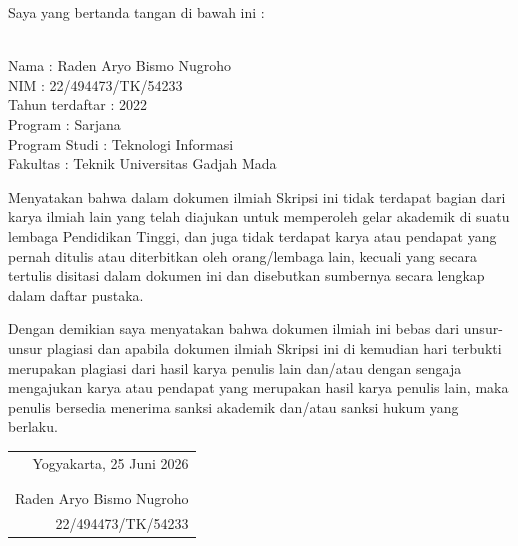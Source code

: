 \noindent Saya yang bertanda tangan di bawah ini :

\vspace{-1em}

\begin{tabbing}
\hspace{40mm} \= \\ %
\noindent Nama \> : Raden Aryo Bismo Nugroho \\[\parskip]
\noindent NIM \> : 22/494473/TK/54233 \\[\parskip]
\noindent Tahun terdaftar \> : 2022 \\[\parskip]
\noindent Program \> : Sarjana \\[\parskip]
\noindent Program Studi \> : Teknologi Informasi \\[\parskip]
\noindent Fakultas \> : Teknik Universitas Gadjah Mada
\end{tabbing}

\noindent Menyatakan bahwa dalam dokumen ilmiah Skripsi ini tidak terdapat bagian dari karya ilmiah lain yang telah diajukan untuk memperoleh gelar akademik di suatu lembaga Pendidikan Tinggi, dan juga tidak terdapat karya atau pendapat yang pernah ditulis atau diterbitkan oleh orang/lembaga lain, kecuali yang secara tertulis disitasi dalam dokumen ini dan disebutkan sumbernya secara lengkap dalam daftar pustaka.

\noindent Dengan demikian saya menyatakan bahwa dokumen ilmiah ini bebas dari unsur-unsur plagiasi dan apabila dokumen ilmiah Skripsi ini di kemudian hari terbukti merupakan plagiasi dari hasil karya penulis lain dan/atau dengan sengaja mengajukan karya atau pendapat yang merupakan hasil karya penulis lain, maka penulis bersedia menerima sanksi akademik dan/atau sanksi hukum yang berlaku.


\begin{flushright}
	\begin{tabular}{r}
		Yogyakarta, 25 Juni 2026 \\
		\vspace{0.7cm} \\
		\vspace{0.7cm} \\
		Raden Aryo Bismo Nugroho \\ 22/494473/TK/54233
	\end{tabular}
\end{flushright}